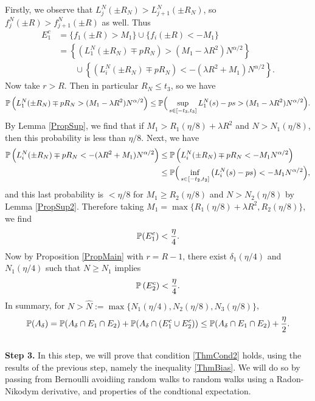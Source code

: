 	Firstly, we observe that $L_j^N(\pm R_N)> L_{j+1}^N(\pm R_N)$, so $f_j^N(\pm R)>f_{j+1}^N(\pm R)$ as well. Thus
	\begin{align*}
	E_1^c &= \{f_1(\pm R)> M_1\} \cup \{f_i(\pm R)<-M_1\} \\
	&= \left\{ \left(L_1^N(\pm R_N)\mp pR_N\right)> (M_1-\lambda R^2)N^{\alpha/2}\right\}\\
	&\qquad \cup \left\{\left(L_i^N(\pm R_N)\mp pR_N\right)< -(\lambda R^2+M_1)N^{\alpha/2}\right\}.
	\end{align*}
	Now take $r>R$. Then in particular $R_N \leq t_3$, so we have $$
	\mathbb{P}\left(L_1^N(\pm R_N)\mp pR_N>(M_1-\lambda R^2)N^{\alpha/2}\right)
	\leq\mathbb{P}\Big(\sup_{s\in[-t_3,t_3]}L_1^N(s)-ps>(M_1-\lambda R^2)N^{\alpha/2}\Big).
	$$ By Lemma \ref{PropSup}, we find that if $M_1>R_1(\eta/8)+\lambda R^2$ and $N>N_1(\eta/8)$, then this probability is less than $\eta/8$. Next, we have
	\begin{align*}
	\mathbb{P} \left(L_i^N(\pm R_N)\mp pR_N< -(\lambda R^2+M_1)N^{\alpha/2}\right)&\leq \mathbb{P} \left(L_i^N(\pm R_N)\mp pR_N< -M_1N^{\alpha/2}\right)\\
	&\leq \mathbb{P}\Big(\inf_{s\in[-t_2,t_2]}\big(L_i^N(s)-ps\big)<-M_1N^{\alpha/2}\Big),
	\end{align*}
	and this last probability is $<\eta/8$ for $M_1\geq R_2(\eta/8)$ and $N>N_2(\eta/8)$ by Lemma \ref{PropSup2}. Therefore taking $M_1=\max\{R_1(\eta/8)+\lambda R^2,R_2(\eta/8)\}$, we find $$\mathbb{P}(E_1^c)<\frac{\eta}{4}.$$
	Now by Proposition \ref{PropMain} with $r=R-1$, there exist $\delta_1(\eta/4)$ and $N_1(\eta/4)$ such that $N\geq N_1$ implies 
	\[
	\mathbb{P}\left( E_2^c\right)<\frac{\eta}{4}.
	\]
	In summary, for $N>\hat N:= \max\{N_1(\eta/4),N_2(\eta/8),N_3(\eta/8)\}$, 
	\begin{equation}
	\mathbb{P}(A_\delta)= \mathbb{P}(A_\delta\cap E_1\cap E_2)+\mathbb{P}(A_\delta\cap\left(E_1^c\cup E_2^c\right))\leq \mathbb{P}(A_\delta\cap E_1\cap E_2)+\frac{\eta}{2}. \label{ThmBias}
	\end{equation}\\
	
	\noindent\textbf{Step 3.} In this step, we will prove that condition \ref{ThmCond2} holds, using the results of the previous step, namely the inequality \ref{ThmBias}. We will do so by passing from Bernoulli avoidiing random walks to random walks using a Radon-Nikodym derivative, and properties of the condtional expectation. 
	
